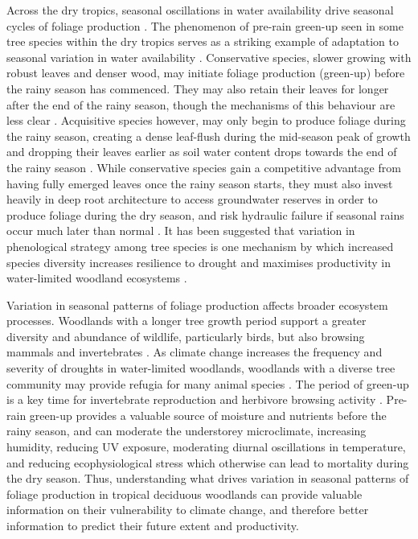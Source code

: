 \documentclass[11pt,a4paper]{article}
\begin{document}
Across the dry tropics, seasonal oscillations in water availability drive
seasonal cycles of foliage production \citep{Chidumayo2001, Dahlin2016}. The
phenomenon of pre-rain green-up seen in some tree species within the dry
tropics serves as a striking example of adaptation to seasonal variation in
water availability \citep{Ryan2017}. Conservative species, slower growing with
robust leaves and denser wood, may initiate foliage production (green-up)
before the rainy season has commenced. They may also retain their leaves for
longer after the end of the rainy season, though the mechanisms of this
behaviour are less clear \citep{Giraldo2011, Kushwaha2011}. Acquisitive species
however, may only begin to produce foliage during the rainy season, creating a
dense leaf-flush during the mid-season peak of growth and dropping their leaves
earlier as soil water content drops towards the end of the rainy season
\citep{Lasky2016}. While conservative species gain a competitive advantage from
having fully emerged leaves once the rainy season starts, they must also invest
heavily in deep root architecture to access groundwater reserves in order to
produce foliage during the dry season, and risk hydraulic failure if seasonal
rains occur much later than normal \citep{Vinya2018}. It has been suggested
that variation in phenological strategy among tree species is one mechanism by
which increased species diversity increases resilience to drought and maximises
productivity in water-limited woodland ecosystems \citep{Stan2019,
Morellato2016}. 

Variation in seasonal patterns of foliage production affects broader ecosystem
processes. Woodlands with a longer tree growth period support a greater
diversity and abundance of wildlife, particularly birds, but also browsing
mammals and invertebrates \citep{Cole2015, Araujo2017, Morellato2016,
Ogutu2013}. As climate change increases the frequency and severity of droughts
in water-limited woodlands, woodlands with a diverse tree community may provide
refugia for many animal species \citep{Bale2002}. The period of green-up is a
key time for invertebrate reproduction \citep{Prather2012} and herbivore
browsing activity \citep{Velasque2016, Morellato2016}. Pre-rain green-up
provides a valuable source of moisture and nutrients before the rainy season,
and can moderate the understorey microclimate, increasing humidity, reducing UV
exposure, moderating diurnal oscillations in temperature, and reducing
ecophysiological stress which otherwise can lead to mortality during the dry
season. Thus, understanding what drives variation in seasonal patterns of
foliage production in tropical deciduous woodlands can provide valuable
information on their vulnerability to climate change, and therefore better
information to predict their future extent and productivity.
\end{document}
